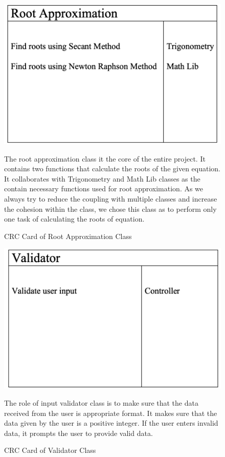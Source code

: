   \begin{figure}
    \centering
    \includegraphics[width=.5\linewidth]{resources/RootApproximation.png}
    \caption{CRC Card of Root Approximation Class}\label{fig:rootapprox}

    \parbox{1.0\linewidth}{
      The root approximation class it the core of the entire project. It contains two functions that calculate the roots of the given equation. It collaborates with Trigonometry and Math Lib classes as the contain necessary functions used for root approximation. As we always try to reduce the coupling with multiple classes and increase the cohesion within the class, we chose this class as to perform only one task of calculating the roots of equation.
      }
  \end{figure} 
  \begin{figure}
    \centering
    \includegraphics[width=.5\linewidth]{resources/Validator.png}
    \caption{CRC Card of Validator Class}\label{fig:validator}
    \parbox{1.0\linewidth}{
      The role of input validator class is to make sure that the data received from the user is appropriate format. It makes sure that the data given by the user is a positive integer. If the user enters invalid data, it prompts the user to provide valid data.
      }
  \end{figure}  
